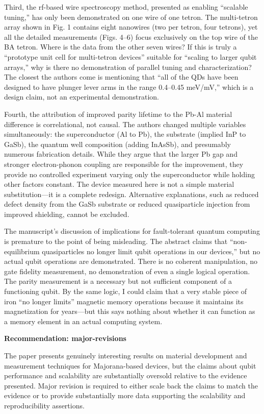 \documentclass[10pt,letterpaper]{article}
\begin{document}
Third, the rf-based wire spectroscopy method, presented as enabling ``scalable tuning,'' has only been demonstrated on one wire of one tetron. The multi-tetron array shown in Fig. 1 contains eight nanowires (two per tetron, four tetrons), yet all the detailed measurements (Figs. 4--6) focus exclusively on the top wire of the BA tetron. Where is the data from the other seven wires? If this is truly a ``prototype unit cell for multi-tetron devices'' suitable for ``scaling to larger qubit arrays,'' why is there no demonstration of parallel tuning and characterization? The closest the authors come is mentioning that ``all of the QDs have been designed to have plunger lever arms in the range 0.4--0.45 meV/mV,'' which is a design claim, not an experimental demonstration.

Fourth, the attribution of improved parity lifetime to the Pb-Al material difference is correlational, not causal. The authors changed multiple variables simultaneously: the superconductor (Al to Pb), the substrate (implied InP to GaSb), the quantum well composition (adding InAsSb), and presumably numerous fabrication details. While they argue that the larger Pb gap and stronger electron-phonon coupling are responsible for the improvement, they provide no controlled experiment varying only the superconductor while holding other factors constant. The device measured here is not a simple material substitution---it is a complete redesign. Alternative explanations, such as reduced defect density from the GaSb substrate or reduced quasiparticle injection from improved shielding, cannot be excluded.

The manuscript's discussion of implications for fault-tolerant quantum computing is premature to the point of being misleading. The abstract claims that ``non-equilibrium quasiparticles no longer limit qubit operations in our devices,'' but no actual qubit operations are demonstrated. There is no coherent manipulation, no gate fidelity measurement, no demonstration of even a single logical operation. The parity measurement is a necessary but not sufficient component of a functioning qubit. By the same logic, I could claim that a very stable piece of iron ``no longer limits'' magnetic memory operations because it maintains its magnetization for years---but this says nothing about whether it can function as a memory element in an actual computing system.

\textbf{Recommendation: major-revisions}

The paper presents genuinely interesting results on material development and measurement techniques for Majorana-based devices, but the claims about qubit performance and scalability are substantially oversold relative to the evidence presented. Major revision is required to either scale back the claims to match the evidence or to provide substantially more data supporting the scalability and reproducibility assertions.
\end{document}
